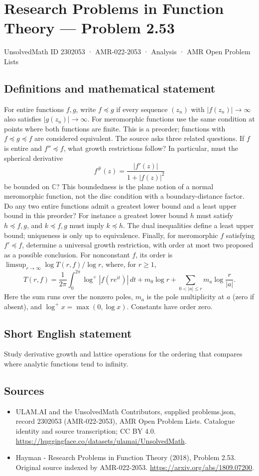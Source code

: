 \documentclass[11pt,a4paper]{article}
\begin{document}
\section*{Research Problems in Function Theory — Problem 2.53}\label{2302053}
{\small UnsolvedMath ID 2302053 · AMR-022-2053 · Analysis · AMR Open Problem Lists}
\subsection{Definitions and mathematical statement}
For entire functions $f,g$, write $f\preceq g$ if every sequence $(z_n)$ with $|f(z_n)|\to\infty$ also satisfies $|g(z_n)|\to\infty$. For meromorphic functions use the same condition at points where both functions are finite. This is a preorder; functions with $f\preceq g\preceq f$ are considered equivalent.
The source asks three related questions. If $f$ is entire and $f''\preceq f$, what growth restrictions follow? In particular, must the spherical derivative
\[
f^{\#}(z)=\frac{|f'(z)|}{1+|f(z)|^2}
\]
be bounded on $\mathbb C$? This boundedness is the plane notion of a normal meromorphic function, not the disc condition with a boundary-distance factor.
Do any two entire functions admit a greatest lower bound and a least upper bound in this preorder? For instance a greatest lower bound $h$ must satisfy $h\preceq f,g$, and $k\preceq f,g$ must imply $k\preceq h$. The dual inequalities define a least upper bound; uniqueness is only up to equivalence.
Finally, for meromorphic $f$ satisfying $f'\preceq f$, determine a universal growth restriction, with order at most two proposed as a possible conclusion. For nonconstant $f$, its order is $\limsup_{r\to\infty}\log T(r,f)/\log r$, where, for $r\ge1$,
\[
T(r,f)=\frac1{2\pi}\int_0^{2\pi}\log^+|f(re^{it})|\,dt
 +m_0\log r+\sum_{0<|a|\le r}m_a\log\frac r{|a|}.
\]
Here the sum runs over the nonzero poles, $m_a$ is the pole multiplicity at $a$ (zero if absent), and $\log^+x=\max(0,\log x)$. Constants have order zero.
\subsection{Short English statement}
Study derivative growth and lattice operations for the ordering that compares where analytic functions tend to infinity.
\subsection{Sources}
\begin{itemize}
\item[S1] ULAM.AI and the UnsolvedMath Contributors, supplied problems.json, record 2302053 (AMR-022-2053), AMR Open Problem Lists. Catalogue identity and source transcription; CC BY 4.0.
\url{https://huggingface.co/datasets/ulamai/UnsolvedMath}.
\item[S2] Hayman - Research Problems in Function Theory (2018), Problem 2.53. Original source indexed by AMR-022-2053.
\url{https://arxiv.org/abs/1809.07200}.
\end{itemize}
\end{document}
